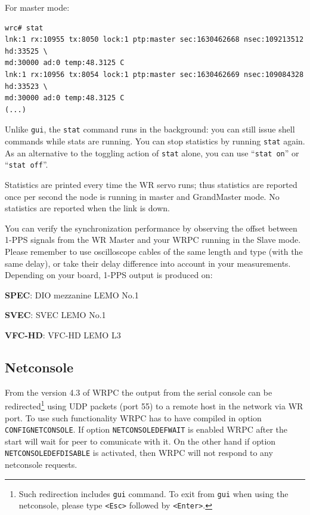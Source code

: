 \documentclass[a4paper, 12pt]{article}
\renewcommand{\_}{\underscore\allowbreak}
\begin{document}
For master mode:
\begin{lstlisting}
wrc# stat
lnk:1 rx:10955 tx:8050 lock:1 ptp:master sec:1630462668 nsec:109213512 hd:33525 \
md:30000 ad:0 temp:48.3125 C
lnk:1 rx:10956 tx:8054 lock:1 ptp:master sec:1630462669 nsec:109084328 hd:33523 \
md:30000 ad:0 temp:48.3125 C
(...)
\end{lstlisting}

\vspace{1em}
Unlike \texttt{gui}, the \texttt{stat} command runs in the background: you can still
issue shell commands while stats are running. You can stop statistics by running
\texttt{stat} again. As an alternative to the toggling action of \texttt{stat}
alone, you can use ``\texttt{stat on}'' or ``\texttt{stat off}''.

Statistics are printed every time the WR servo runs; thus statistics
are reported once per second the node is running in master and GrandMaster mode.
No statistics are reported when the link is down.

You can verify the synchronization performance by observing the offset between
1-PPS signals from the WR Master and your WRPC running in the Slave mode. Please
remember to use oscilloscope cables of the same length and type (with the same
delay), or take their delay difference into account in your measurements.
Depending on your board, 1-PPS output is produced on:
\begin{itemize*}
  \item \textbf{SPEC}: DIO mezzanine LEMO No.1
  \item \textbf{SVEC}: SVEC LEMO No.1
  \item \textbf{VFC-HD}: VFC-HD LEMO L3
\end{itemize*}

\subsection{Netconsole}
\label{Netconsole}
From the version 4.3 of WRPC the output from the serial console can be
redirected\footnote{Such redirection includes \texttt{gui} command.
To exit from \texttt{gui} when using the netconsole, please type
\texttt{<Esc>} followed by \texttt{<Enter>}.}
using UDP packets (port 55) to a remote host in the network via WR port. To use such
functionality WRPC has to have compiled in option \texttt{CONFIG\_NETCONSOLE}.
If option \texttt{NETCONSOLE\_DEF\_WAIT} is enabled WRPC after the start will
wait for peer to comunicate with it. On the other hand if option
\texttt{NETCONSOLE\_DEF\_DISABLE} is activated, then WRPC will not respond
to any netconsole requests.
\end{document}
